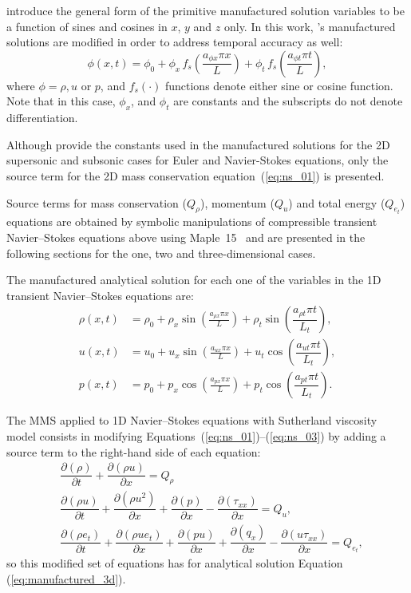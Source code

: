 \documentclass[10pt]{article}
\newcommand{\Diff}[2] {\dfrac{\partial( #1)}{\partial #2}}
\begin{document}
\citet{Roy2002} introduce the general form of the primitive manufactured solution variables to be  a function of sines and cosines in $x$, $y$ and $z$ only. In this work, \citet{Roy2002}'s manufactured solutions are modified in order to address temporal accuracy as well:
\begin{equation}
 \label{eq:manufactured01}
  \phi (x,t) = \phi_0+ \phi_x\, f_s \left(\frac{a_{\phi x} \pi x}{L} \right) +   \phi_t \,f_s\left(\frac{a_{\phi t} \pi t}{L}\right),
\end{equation}
where $\phi=\rho,u$ or $p$, and $f_s(\cdot)$ functions denote either sine or cosine function. Note that in this case, $\phi_x$,  and $\phi_t$ are constants  and the subscripts do not denote differentiation.



Although \citet{Roy2002} provide the constants used in the manufactured solutions for the 2D supersonic and subsonic cases for Euler and Navier-Stokes equations, only the source term for the 2D mass conservation equation~(\ref{eq:ns_01}) is presented.


Source terms  for mass conservation ($Q_\rho$), momentum ($Q_u$)  and total energy ($Q_{e_t}$) equations are obtained by symbolic manipulations of compressible transient Navier--Stokes equations above using Maple~15~\citep{Maple15} and are presented in the following sections for the one, two and three-dimensional cases.


The manufactured analytical solution for each one of the variables in the 1D transient Navier--Stokes equations are:
\begin{equation}
\begin{split}
\label{eq:manufactured_3d} 
\rho\left( x  ,t\right) &=  \rho_{0}+ \rho_{x} \sin\left(\frac{a_{ \rho  x} \pi x}{L}\right)  + \rho_t \sin\left(\dfrac{a_{\rho t} \pi t}{L_t}\right),\\
%
u\left( x  ,t\right) &= u_{0}+u_{x} \sin\left(\frac{a_{u  x} \pi x}{L}\right)+ u_t \cos\left(\dfrac{a_{u t} \pi t}{L_t}\right),\\
%
%
p\left( x  ,t\right) &= p_{0}+p_{x} \cos\left(\frac{a_{p  x} \pi x}{L}\right)+ p_t \cos\left(\dfrac{a_{p t} \pi t}{L_t}\right).
\end{split}
\end{equation}


The MMS applied to 1D Navier--Stokes equations  with Sutherland viscosity model consists in modifying Equations~(\ref{eq:ns_01})--(\ref{eq:ns_03}) by adding a source term to the right-hand side of each equation:
\begin{equation}
\begin{split}
\label{eq:ns_1d_mod}
&\Diff{\rho}{t} +\Diff{\rho u}{x} = Q_\rho\\
%
 &\Diff{\rho u}{t} +\Diff{\rho u^2 }{x} +\Diff{p}{x}-\Diff{\tau_{xx}}{x}= Q_u,\\
 &\Diff{\rho e_t}{t} +\Diff{\rho u e_t}{x}+\Diff{pu}{x}+\Diff{q_x}{x} -\Diff{u\tau_{xx}}{x}=Q_{e_t},
\end{split}
\end{equation}
so this modified set of equations has for analytical solution Equation (\ref{eq:manufactured_3d}).
\end{document}
